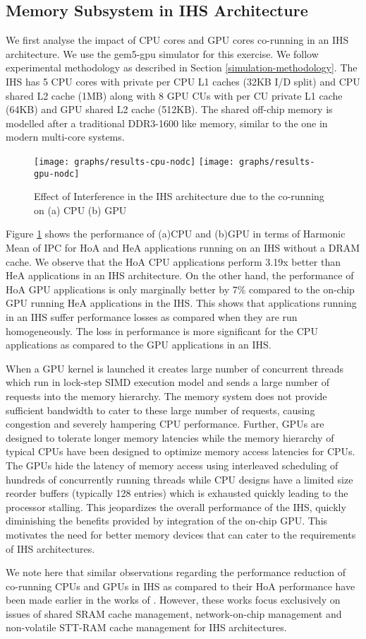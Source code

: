 \subsection{Memory Subsystem in IHS Architecture}
We first analyse the impact of CPU cores and GPU cores co-running in an IHS architecture. 
We use the gem5-gpu \cite{gem5-gpu} simulator for this exercise. We follow experimental methodology as described in Section \ref{simulation-methodology}. The IHS has 5 CPU cores with private per CPU L1 caches (32KB I/D split) and CPU shared L2 cache (1MB) along with 8 GPU CUs with per CU private L1 cache (64KB) and GPU shared L2 cache (512KB).
The shared off-chip memory is modelled after a traditional DDR3-1600 like memory, similar to the one in modern multi-core systems. 
\begin{figure}[htb]
	\centering
	\texttt{[image: graphs/results-cpu-nodc]}
	\texttt{[image: graphs/results-gpu-nodc]}
	\caption{Effect of Interference in the IHS architecture due to the co-running on (a) CPU (b) GPU}
	\label{results-interference}
\end{figure}
\par Figure \ref{results-interference} shows the performance of (a)CPU and (b)GPU in terms of Harmonic Mean of IPC for HoA and HeA applications running on an IHS without a DRAM cache. We observe that the HoA CPU applications perform 3.19x better than HeA applications in an IHS architecture. On the other hand, the performance of HoA GPU applications is only marginally better by 7\% compared to the on-chip GPU running HeA applications in the IHS. This shows that applications running in an IHS suffer performance losses as compared when they are run homogeneously. The loss in performance is more significant for the CPU applications as compared to the GPU applications in an IHS. 
\par When a GPU kernel is launched it creates large number of concurrent threads which run in lock-step SIMD execution model and sends a large number of requests into the memory hierarchy. The memory system does not provide sufficient bandwidth to cater to these large number of requests, causing congestion and severely hampering CPU performance. Further, GPUs are designed to tolerate longer memory latencies while the memory hierarchy of typical CPUs have been designed to optimize memory access latencies for CPUs. The GPUs hide the latency of memory access using interleaved scheduling of hundreds of concurrently running threads while CPU designs have a limited size reorder buffers (typically 128 entries) which is exhausted quickly leading to the processor stalling. This jeopardizes the overall performance of the IHS, quickly diminishing the benefits provided by integration of the on-chip GPU. This motivates the need for better memory devices that can cater to the requirements of IHS architectures.
\par We note here that similar observations regarding the performance reduction of co-running CPUs and GPUs in IHS as compared to their HoA performance have been made earlier in the works of \cite{helm,oscar}. However, these works focus exclusively on issues of shared SRAM cache management, network-on-chip management and non-volatile STT-RAM cache management for IHS architectures.

